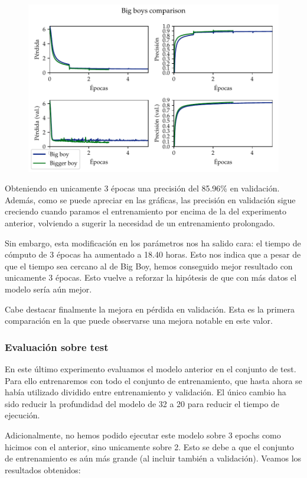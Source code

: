 \documentclass[a4paper, 20pt, dvipsnames]{article}
\begin{document}
\begin{figure}[H]
	\centering
	\includegraphics{fig/bigboys.pdf}
\end{figure}

Obteniendo en unicamente 3 épocas una precisión del 85.96\% en
validación. Además, como se puede apreciar en las gráficas, las precisión en
validación sigue creciendo cuando paramos el entrenamiento por encima de la del
experimento anterior, volviendo a sugerir la necesidad de un entrenamiento
prolongado.

Sin embargo, esta modificación en los parámetros nos ha salido cara: el tiempo
de cómputo de 3 épocas ha aumentado a 18.40 horas. Esto nos indica que a pesar
de que el tiempo sea cercano al de Big Boy, hemos conseguido mejor resultado con
unicamente 3 épocas. Esto vuelve a reforzar la hipótesis de que con más datos el
modelo sería aún mejor.

Cabe destacar finalmente la mejora en pérdida en validación. Esta es la primera
comparación en la que puede observarse una mejora notable en este valor.


\subsubsection{Evaluación sobre test}

En este último experimento evaluamos el modelo anterior en el conjunto de test.
Para ello entrenaremos con todo el conjunto de entrenamiento, que hasta ahora
se había utilizado dividido entre entrenamiento y validación. El único cambio ha sido reducir la profundidad del modelo de 32 a 20 para reducir el tiempo de ejecución.

Adicionalmente, no hemos podido ejecutar este modelo sobre 3 epochs como hicimos
con el anterior, sino unicamente sobre 2. Esto se debe a que el conjunto de
entrenamiento es aún más grande (al incluir también a validación). Veamos los
resultados obtenidos:
\end{document}
